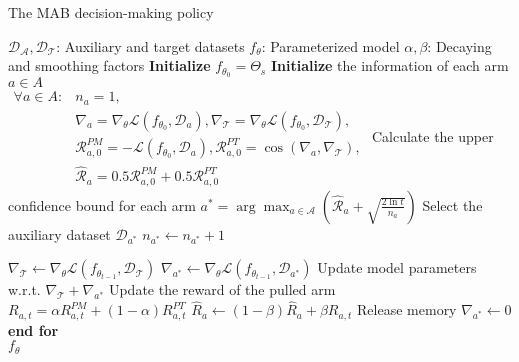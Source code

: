 \vspace{-0.2cm}
\begin{algorithm}
  \caption{The MAB decision-making policy}
  \label{ucb}
  \begin{algorithmic}[1]
    \Require $\mathcal{D}_\mathcal{A}, \mathcal{D}_\mathcal{T}$: Auxiliary and target datasets
    \Require $f_\theta$: Parameterized model
    \Require $\alpha,\beta$: Decaying  and smoothing factors
    \State \textbf{Initialize} $f_{\theta_0}=\Theta_s$
    \State \textbf{Initialize} the information of each arm $a \in A$\\
    $\begin{array}{ll}
        \forall a \in A: & n_a = 1, \\
        &\nabla_{a} = \nabla_\theta \mathcal{L}(f_{\theta_0}, \mathcal{D}_a),
        \nabla_\mathcal{T} =\nabla_\theta\mathcal{L}(f_{\theta_0}, \mathcal{D}_\mathcal{T}),\\
        & \mathcal{R}^{PM}_{a,0} = -\mathcal{L}(f_{\theta_0},\mathcal{D}_a),
        \mathcal{R}^{PT}_{a,0} = 
        \cos(\nabla_{a}, \nabla_\mathcal{T}),\\
        & \hat{\mathcal{R}}_{a} = 0.5 \mathcal{R}^{PM}_{a,0} + 0.5 \mathcal{R}^{PT}_{a,0}
        \end{array} $
        \State Calculate the upper confidence bound for each arm
        \State $a^* = \arg\max_{a \in \mathcal{A}} \left(\hat{\mathcal{R}}_{a} + \sqrt{\frac{2 \ln t}{n_a}}\right)$
        \State Select the auxiliary dataset $\mathcal{D}_{a^*}$
        \State $n_{a^*} \leftarrow n_{a^*} + 1$

        \State $\nabla_\mathcal{T} \leftarrow\nabla_\theta\mathcal{L}(f_{\theta_{t-1}}, \mathcal{D}_\mathcal{T})$ 
        \State $\nabla_{a^*} \leftarrow \nabla_\theta \mathcal{L}(f_{\theta_{t-1}}, \mathcal{D}_{a^*})$
        \State Update model parameters w.r.t. $\nabla_\mathcal{T} + \nabla_{a^*}$
        \State Update the reward of the pulled arm
        \State $R_{a,t} = \alpha R^{PM}_{a,t} + (1-\alpha) R^{PT}_{a,t}$
        \State $\hat{R}_{a} \leftarrow (1 - \beta)\hat{R}_{a} + \beta R_{a,t}$
        \State Release memory $\nabla_{a^*} \leftarrow 0$
    \EndFor
    \State \textbf{end for}  \\
    \Return $f_\theta$
  \end{algorithmic}
  \vspace{-0.1cm}
\end{algorithm}
\vspace{-0.3cm}
